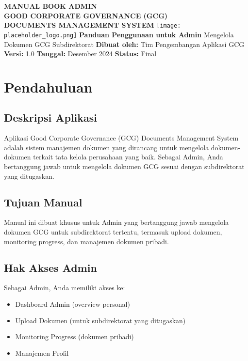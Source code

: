 \documentclass[12pt,a4paper]{article}
\begin{document}
\begin{titlepage}
\centering
\vspace*{2cm}
{\Huge\bfseries\color{darkblue} MANUAL BOOK ADMIN\\[0.5cm] GOOD CORPORATE GOVERNANCE (GCG)\\[0.5cm] DOCUMENTS MANAGEMENT SYSTEM}
\vspace{2cm}
\texttt{[image: placeholder\_logo.png]}
\vspace{2cm}
{\Large\bfseries Panduan Penggunaan untuk Admin}
\vspace{1cm}
{\large Mengelola Dokumen GCG Subdirektorat}
\vfill
{\large \textbf{Dibuat oleh:} Tim Pengembangan Aplikasi GCG}
\vspace{0.5cm}
{\large \textbf{Versi:} 1.0}
\vspace{0.5cm}
{\large \textbf{Tanggal:} Desember 2024}
\vspace{0.5cm}
{\large \textbf{Status:} Final}
\vspace{1cm}
\end{titlepage}

\tableofcontents
\newpage

\section{Pendahuluan}

\subsection{Deskripsi Aplikasi}
Aplikasi Good Corporate Governance (GCG) Documents Management System adalah sistem manajemen dokumen yang dirancang untuk mengelola dokumen-dokumen terkait tata kelola perusahaan yang baik. Sebagai Admin, Anda bertanggung jawab untuk mengelola dokumen GCG sesuai dengan subdirektorat yang ditugaskan.

\subsection{Tujuan Manual}
Manual ini dibuat khusus untuk Admin yang bertanggung jawab mengelola dokumen GCG untuk subdirektorat tertentu, termasuk upload dokumen, monitoring progress, dan manajemen dokumen pribadi.

\subsection{Hak Akses Admin}
Sebagai Admin, Anda memiliki akses ke:
\begin{itemize}
\item Dashboard Admin (overview personal)
\item Upload Dokumen (untuk subdirektorat yang ditugaskan)
\item Monitoring Progress (dokumen pribadi)
\item Manajemen Profil
\end{itemize}
\end{document}
